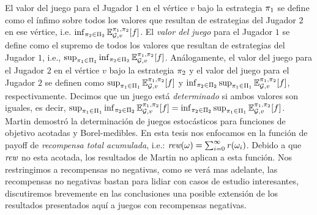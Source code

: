 El valor del juego para el Jugador $1$ en el vértice $v$ bajo la estrategia $\pi_{1}$ se define como el ínfimo sobre todos los valores que resultan de estrategias del Jugador $2$ en ese vértice, i.e. $\inf_{\pi_{2} \in \Pi_{2}} \mathbb{E}^{\pi_{1}, \pi_{2}}_{\mathcal{G},v}[f]$.
El \emph{valor del juego} para el Jugador $1$ se define como el supremo de todos los valores que resultan de estrategias del Jugador $1$, i.e., $\sup_{\pi_{1} \in \Pi_{1}} \inf_{\pi_{2} \in \Pi_{2}} \mathbb{E}^{\pi_{1}, \pi_{2}}_{\mathcal{G},v}[f]$.
Análogamente, el valor del juego para el Jugador $2$ en el vértice $v$ bajo la estrategia $\pi_{2}$ y el valor del juego para el Jugador $2$ se definen como $\sup_{\pi_{1} \in \Pi_{1}}  \mathbb{E}^{\pi_{1}, \pi_{2}}_{\mathcal{G},v}[f]$ 
y $\inf_{\pi_{2} \in \Pi_{2}} \sup_{\pi_{1} \in \Pi_{1}}  \mathbb{E}^{\pi_{1}, \pi_{2}}_{\mathcal{G},v}[f]$, respectivamente. Decimos que un juego está \emph{determinado} si ambos valores son iguales, es decir,
	$\sup_{\pi_{1} \in \Pi_{1}} \inf_{\pi_{2} \in \Pi_{2}} \mathbb{E}^{\pi_{1}, \pi_{2}}_{\mathcal{G},v}[f]
	=
	\inf_{\pi_{2} \in \Pi_{2}} \sup_{\pi_{1} \in \Pi_{1}} \mathbb{E}^{\pi_{1}, \pi_{2}}_{\mathcal{G},v}[f]$.
Martin \cite{Martin98} demostró la determinación de juegos estocásticos para funciones de objetivo acotadas y Borel-medibles.
En esta tesis nos enfocamos en la función de payoff de \emph{recompensa total acumulada}, i.e.: $\textit{rew}(\omega) = \sum^\infty_{i=0} \mathit{r}(\omega_i)$. Debido a que $\textit{rew}$ no esta acotada, los resultados de Martin \cite{Martin98} no aplican a esta función. Nos restringimos a recompensas no negativas, como se verá mas adelante, las recompensas no negativas bastan para lidiar con casos de estudio interesantes, discutiremos brevemente en las conclusiones una posible extensión de los resultados presentados aquí a juegos con recompensas negativas.



	

